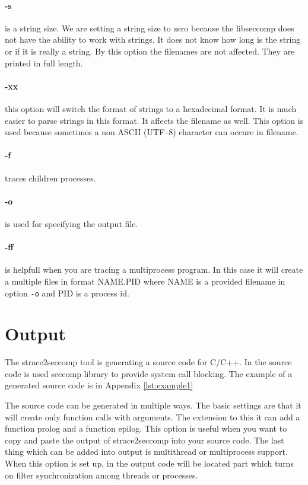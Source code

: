 \paragraph{-s} is a string size. We are setting a string size to zero because
the libseccomp does not have the ability to work with strings. It does not know
how long is the string or if it is really a string. By this option the filenames
are not affected. They are printed in full length.

\paragraph{-xx} this option will switch the format of strings to a hexadecimal format.
It is much easier to parse strings in this format. It affects the filename as well.
This option is used because sometimes a non ASCII (UTF--8) character can occure in filename.

\paragraph{-f} traces children processes.

\paragraph{-o} is used for specifying the output file.

\paragraph{-ff} is helpfull when you are tracing a multiprocess program. In this
case it will create a multiple files in format NAME.PID where NAME is a provided
filename in option \texttt{-o} and PID is a process id.

\section{Output}
The strace2seccomp tool is generating a source code for C/C++.
In the source code is used seccomp library to provide system call blocking.
The example of a generated source code is in Appendix \ref{lst:example1}

The source code can be generated in multiple ways. The basic settings are that
it will create only function calls with arguments. The extension to this it can
add a function prolog and a function epilog. This option is useful when you want
to copy and paste the output of strace2seccomp into your source code. The last
thing which can be added into output is multithread or multiprocess support.
When this option is set up, in the output code will be located part which turns
on filter synchronization among threads or processes.

